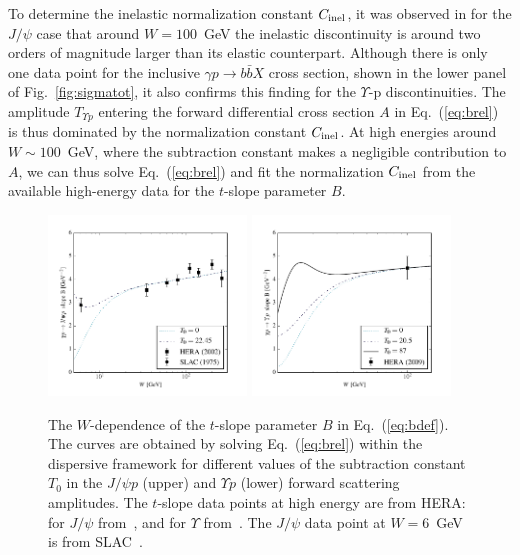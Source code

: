 \documentclass[prd,amsmath,%
twocolumn,floatfix,amssymb, preprintnumbers, linenumbers,nofootinbib, superscriptaddress]{revtex4}
\begin{document}
To determine the inelastic normalization constant $C_{\rm inel}$, it was observed in \cite{Gryniuk:2016mpk} for the $J/\psi$ case that around 
$W = 100$~GeV the inelastic discontinuity is around two orders of magnitude larger than its elastic counterpart. Although there is only one data point for the inclusive $\gamma p \to b \bar b X$ cross section, shown in the lower panel of  Fig.~\ref{fig:sigmatot}, it also confirms this finding for the $\Upsilon$-p discontinuities.   
The amplitude $T_{\Upsilon p}$ entering the forward differential cross section $A$ in Eq.~(\ref{eq:brel}) is thus dominated by the normalization constant $C_{\rm inel}$. At high energies around $W \sim 100$~GeV, where the subtraction constant makes a negligible contribution to $A$, we can thus solve Eq.~(\ref{eq:brel}) and fit the normalization $C_{\rm inel}$ from the available high-energy data for the $t$-slope parameter $B$. 

 

\begin{figure}[h]
\includegraphics[width=0.47\textwidth]{b_slope_jpsi.pdf}
\includegraphics[width=0.47\textwidth]{b_slope_y.pdf}
\caption{
The $W$-dependence of the $t$-slope parameter $B$ in  Eq.~(\ref{eq:bdef}). The curves are obtained by solving 
Eq.~(\ref{eq:brel}) within the dispersive framework  for different values of the subtraction constant $T_0$ in the $J/\psi p $ (upper)  and $\Upsilon p$ (lower) forward scattering amplitudes.
The $t$-slope data points at high energy are from HERA: for $J/\psi$ from~\cite{Chekanov:2002xi}, and 
for $\Upsilon$ from~\cite{Chekanov:2009zz}. 
The $J/\psi$ data point at $W = 6$~GeV is from 
SLAC~\cite{Camerini:1975cy}. 
}
\label{fig:bslope}
\end{figure}
\end{document}
